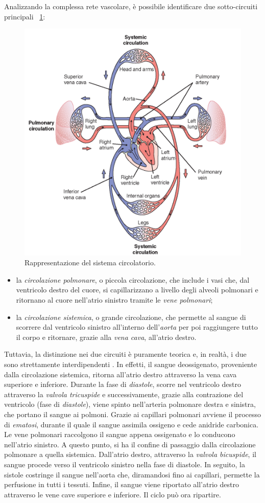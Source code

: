 Analizzando la complessa rete vascolare, è possibile identificare due sotto-circuiti principali \Fig~\ref{fig:SistemaCircolatorio}:
\begin{figure}[h]
	\centering
	\includegraphics[width=0.7\linewidth]{ImageFiles/Fotopletismografia/SistemaCircolatorio}
	\caption{Rappresentazione del sistema circolatorio.}
	\label{fig:SistemaCircolatorio}
\end{figure}
\begin{itemize}
	\item la \textit{circolazione polmonare}, o piccola circolazione, che include i vasi che, dal ventricolo destro del cuore, si capillarizzano a livello degli alveoli polmonari e ritornano al cuore nell'atrio sinistro tramite le \textit{vene polmonari};
	\item la \textit{circolazione sistemica}, o grande circolazione, che permette al sangue di scorrere dal ventricolo sinistro all'interno dell'\textit{aorta} per poi raggiungere tutto il corpo e ritornare, grazie alla \textit{vena cava}, all'atrio destro.
\end{itemize}
Tuttavia, la distinzione nei due circuiti è puramente teorica e, in realtà, i due sono strettamente interdipendenti \cite{Cutfield1983}. In effetti, il sangue deossigenato, proveniente dalla circolazione sistemica, ritorna all'atrio destro attraverso la vena cava superiore e inferiore. Durante la fase di \textit{diastole}, scorre nel ventricolo destro attraverso la \textit{valvola tricuspide} e successivamente, grazie alla contrazione del ventricolo (fase di \textit{diastole}), viene spinto nell'arteria polmonare destra e sinistra, che portano il sangue ai polmoni. Grazie ai capillari polmonari avviene il processo di \textit{ematosi}, durante il quale il sangue assimila ossigeno e cede anidride carbonica. Le vene polmonari raccolgono il sangue appena ossigenato e lo conducono nell'atrio sinistro. A questo punto, si ha il confine di passaggio dalla circolazione polmonare a quella sistemica. Dall'atrio destro, attraverso la \textit{valvola bicuspide}, il sangue procede verso il ventricolo sinistro nella fase di diastole. In seguito, la sistole costringe il sangue nell'aorta che, diramandosi fino ai capillari, permette la perfusione in tutti i tessuti. Infine, il sangue viene riportato all'atrio destro attraverso le vene cave superiore e inferiore. Il ciclo può ora ripartire. 

